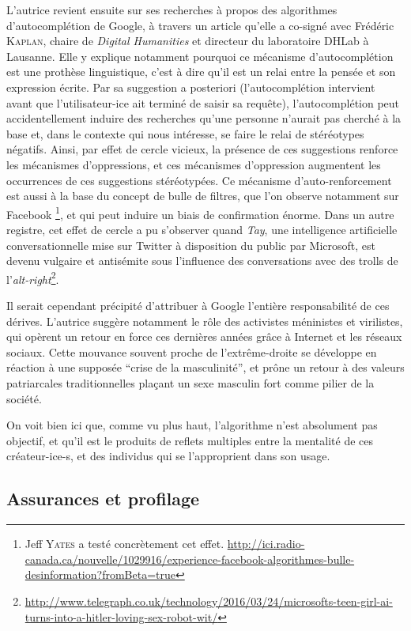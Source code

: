 \documentclass[a4paper,12pt]{report}
\begin{document}
L'autrice revient ensuite sur ses recherches à propos des algorithmes d'autocomplétion de Google, à travers un article qu'elle a co-signé avec Frédéric \textsc{Kaplan}, chaire de \textit{Digital Humanities} et directeur du laboratoire DHLab à Lausanne. Elle y explique notamment pourquoi ce mécanisme d'autocomplétion est une prothèse linguistique, c'est à dire qu'il est un relai entre la pensée et son expression écrite. Par sa suggestion a posteriori (l'autocomplétion intervient avant que l'utilisateur-ice ait terminé de saisir sa requête), l'autocomplétion peut accidentellement induire des recherches qu'une personne n'aurait pas cherché à la base et, dans le contexte qui nous intéresse, se faire le relai de stéréotypes négatifs. Ainsi, par effet de cercle vicieux, la présence de ces suggestions renforce les mécanismes d'oppressions, et ces mécanismes d'oppression augmentent les occurrences de ces suggestions stéréotypées. Ce mécanisme d'auto-renforcement est aussi à la base du concept de bulle de filtres, que l'on observe notamment sur Facebook \footnote{Jeff \textsc{Yates} a testé concrètement cet effet. \url{http://ici.radio-canada.ca/nouvelle/1029916/experience-facebook-algorithmes-bulle-desinformation?fromBeta=true}}, et qui peut induire un biais de confirmation énorme. Dans un autre registre, cet effet de cercle a pu s'observer quand \textit{Tay}, une intelligence artificielle conversationnelle mise sur Twitter à disposition du public par Microsoft, est devenu vulgaire et antisémite sous l'influence des conversations avec des trolls de l'\textit{alt-right}\footnote{\url{http://www.telegraph.co.uk/technology/2016/03/24/microsofts-teen-girl-ai-turns-into-a-hitler-loving-sex-robot-wit/}}.

Il serait cependant précipité d'attribuer à Google l'entière responsabilité de ces dérives. L'autrice suggère notamment le rôle des activistes méninistes et virilistes, qui opèrent un retour en force ces dernières années grâce à Internet et les réseaux sociaux. Cette mouvance souvent proche de l'extrême-droite se développe en réaction à une supposée ``crise de la masculinité'', et prône un retour à des valeurs patriarcales traditionnelles plaçant un sexe masculin fort comme pilier de la société. 

On voit bien ici que, comme vu plus haut, l'algorithme n'est absolument pas objectif, et qu'il est le produits de reflets multiples entre la mentalité de ces créateur-ice-s, et des individus qui se l'approprient dans son usage.

\subsection{Assurances et profilage}
\end{document}

